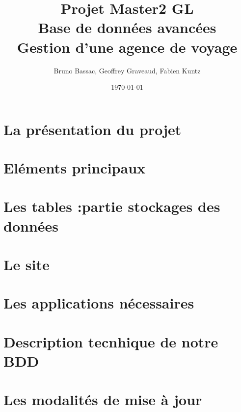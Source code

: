\documentclass[10pt]{article}
\author{Bruno Bassac, Geoffrey Graveaud, Fabien Kuntz}
\title{\textbf{Projet Master2 GL} \\
\textbf{Base de données avancées} \\
Gestion d'une agence de voyage}
\date{\today}
\begin{document}
\maketitle
\tableofcontents
\section{La présentation du projet}
\section{Eléments principaux}
\section{Les tables :partie stockages des données}
\section{Le site}
\section{Les applications nécessaires}
\section{Description tecnhique de notre BDD}
\section{Les modalités de mise à jour}
\end{document}

